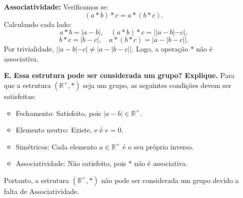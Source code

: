 \documentclass{article}
\begin{document}
\begin{enumerate}
    \textbf{Associatividade:} Verificamos se:
    \[
    (a \ast b) \ast c = a \ast (b \ast c).
    \]
    Calculando cada lado:
    \[
    a \ast b = |a - b|, \quad (a \ast b) \ast c = ||a - b| - c|,
    \]
    \[
    b \ast c = |b - c|, \quad a \ast (b \ast c) = |a - |b - c||.
    \]
    Por trivialidade, \( ||a - b| - c| \neq |a - |b - c|| \). Logo, a operação \( \ast \) não é associativa.
    \item[\textbf{E.}] \textbf{Essa estrutura pode ser considerada um grupo? Explique.}
    Para que a estrutura \( (\mathbb{R}^+, \ast) \) seja um grupo, as seguintes condições devem ser satisfeitas:
    \begin{itemize}
        \item Fechamento: Satisfeito, pois \( |a - b| \in \mathbb{R}^+ \).
        \item Elemento neutro: Existe, e é \( e = 0 \).
        \item Simétricos: Cada elemento \( a \in \mathbb{R}^+ \) é o seu próprio inverso.
        \item Associatividade: Não satisfeito, pois \( \ast \) não é associativa.
    \end{itemize}
    Portanto, a estrutura \( (\mathbb{R}^+, \ast) \) não pode ser considerada um grupo devido a falta de Associatividade.
\end{enumerate}
\end{document}
